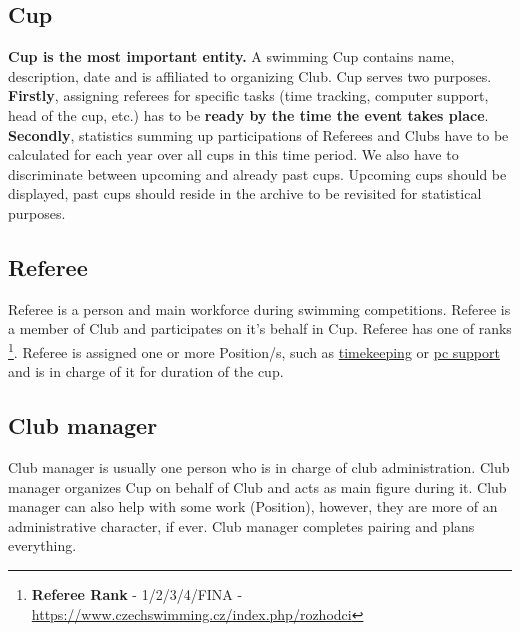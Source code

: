 \subsection*{Cup}
\textbf{Cup is the most important entity.} A swimming Cup contains name, description, date and is affiliated to organizing Club.
Cup serves two purposes. \textbf{Firstly}, assigning referees for specific tasks (time tracking, computer support, head of the cup, etc.) has to be \textbf{ready by the time the event takes place}. \textbf{Secondly}, statistics summing up participations of Referees and Clubs have to be calculated for each year over all cups in this time period. We also have to discriminate between upcoming and already past cups. Upcoming cups should be displayed, past cups should reside in the archive to be revisited for statistical purposes.

\subsection*{Referee}
Referee is a person and main workforce during swimming competitions. Referee is a member of Club and participates on it's behalf in Cup. Referee has one of ranks  \footnote{\textbf{Referee Rank} - 1/2/3/4/FINA - \url{https://www.czechswimming.cz/index.php/rozhodci}}. Referee is assigned one or more Position/s, such as \underline{timekeeping} or \underline{pc support} and is in charge of it for duration of the cup. 
\subsection*{Club manager}
Club manager is usually one person who is in charge of club administration. Club manager organizes Cup on behalf of Club and acts as main figure during it. Club manager can also help with some work (Position), however, they are more of an administrative character, if ever. Club manager completes pairing and plans everything. 
